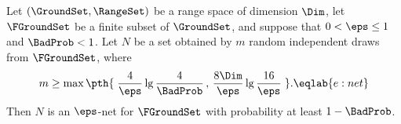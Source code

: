 \begin{theorem}
        Let $(\GroundSet,\RangeSet)$ be a range s{}p\-ace of \VC dimension
        $\Dim$, let $\FGroundSet$ be a finite subset of $\GroundSet$,
        and suppose that $0 < \eps \leq 1$ and $\BadProb < 1$. Let $N$
        be a set obtained by $m$ random independent draws from
        $\FGroundSet$, where
        \begin{equation}
            m \geq \max\pth{\;
               \frac{4}{\eps} \lg \frac{4}{\BadProb} \,,\,
               \frac{8\Dim}{\eps}\lg \frac{16}{\eps} \;}.
            \eqlab{e:net}
        \end{equation}
        Then $N$ is an $\eps$-net for $\FGroundSet$ with probability
        at least $1-\BadProb$.
    \end{theorem}
